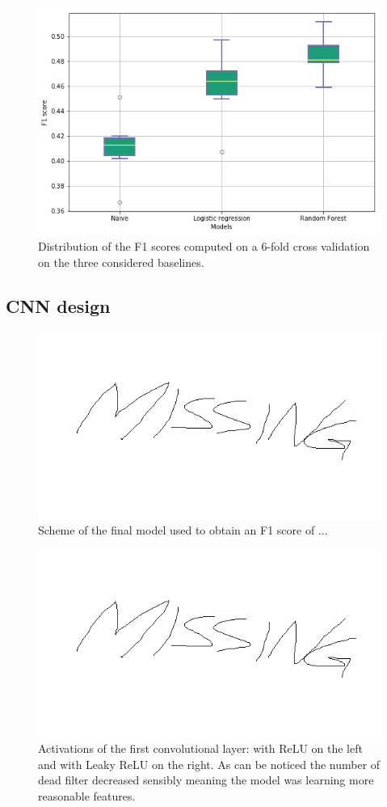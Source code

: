 \documentclass[10pt,conference,compsocconf]{IEEEtran}
\begin{document}
\begin{figure}[tbp]
	\centering
	\includegraphics[width=0.8\columnwidth]{img/boxplots_naive.png}
	\caption{Distribution of the F1 scores computed on a 6-fold cross validation on the three considered baselines.}
	\vspace{-3mm}
	\label{fig:baselines}
\end{figure}
 
\subsection{CNN design}
\begin{figure}[tbp]
	\centering
	\includegraphics[width=0.8\columnwidth]{img/missing.png}
	\caption{Scheme of the final model used to obtain an F1 score of ... }
	\vspace{-3mm}
	\label{fig:cnn-model}
\end{figure}
\begin{figure}[tbp]
	\centering
	\includegraphics[width=0.8\columnwidth]{img/missing.png}
	\caption{Activations of the first convolutional layer: with ReLU on the left and with Leaky ReLU on the right. As can be noticed the number of dead filter decreased sensibly meaning the model was learning more reasonable features.}
	\vspace{-3mm}
	\label{fig:dead-filters}
\end{figure}
\end{document}
